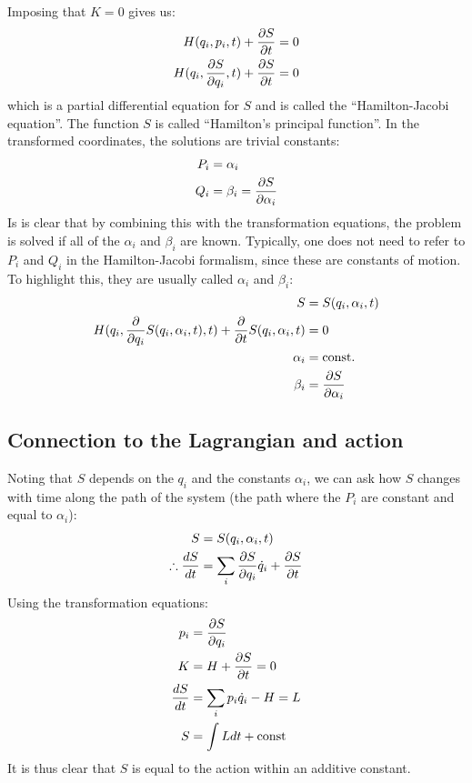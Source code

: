 Imposing that $K=0$ gives us:
\begin{align}
H(q_i,p_i,t)+\frac{\partial S}{\partial t}&=0\nonumber\\
H(q_i,\frac{\partial S}{\partial q_i},t)+\frac{\partial S}{\partial t}&=0
\end{align}
which is a partial differential equation for $S$ and is called the ``Hamilton-Jacobi equation''. The function $S$ is called ``Hamilton's principal function''. In the transformed coordinates, the solutions are trivial constants:
\begin{align}
P_i&=\alpha_i\nonumber\\
Q_i&=\beta_i =\frac{\partial S}{\partial \alpha_i}
\end{align}
Is is clear that by combining this with the transformation equations, the problem is solved if all of the $\alpha_i$ and $\beta_i$ are known. Typically, one does not need to refer to $P_i$ and $Q_i$ in the Hamilton-Jacobi formalism, since these are constants of motion. To highlight this, they are usually called $\alpha_i$ and $\beta_i$:
\begin{align}
S&=S(q_i,\alpha_i,t)\nonumber\\
H(q_i,\frac{\partial }{\partial q_i}S(q_i,\alpha_i,t),t)+\frac{\partial }{\partial t}S(q_i,\alpha_i,t)&=0\nonumber\\
\alpha_i &=\text{const.}\nonumber\\
\beta_i &=\frac{\partial S}{\partial \alpha_i}
\end{align}

\subsection{Connection to the Lagrangian and action}

Noting that $S$ depends on the $q_i$ and the constants $\alpha_i$, we can ask how $S$ changes with time along the path of the system (the path where the $P_i$ are constant and equal to $\alpha_i$):
\begin{align}
S&=S(q_i,\alpha_i,t)\nonumber\\
\therefore\frac{dS}{dt}&=\sum_i\frac{\partial S}{\partial q_i}\dot q_i +\frac{\partial S}{\partial t}
\end{align}
Using the transformation equations:
\begin{align}
p_i&=\frac{\partial S}{\partial q_i}\nonumber\\
K&=H+\frac{\partial S}{\partial t}=0\nonumber\\
\frac{dS}{dt}&=\sum_ip_i\dot q_i -H=L\nonumber\\
S&=\int L dt+ \text{const}
\end{align}
It is thus clear that $S$ is equal to the action within an additive constant.


